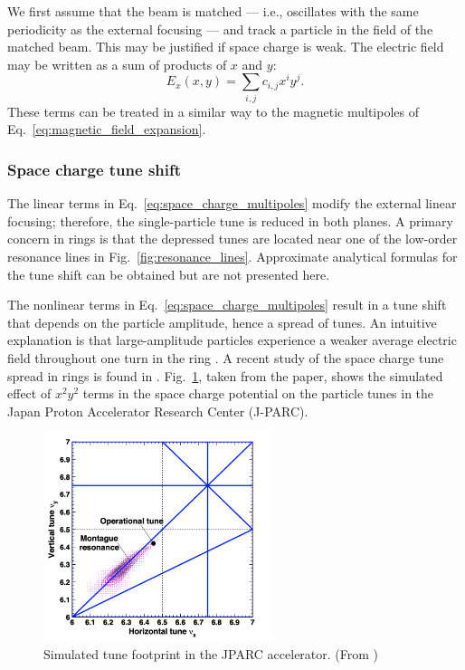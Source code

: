 We first assume that the beam is matched — i.e., oscillates with the same periodicity as the external focusing — and track a particle in the field of the matched beam. This may be justified if space charge is weak. The electric field may be written as a sum of products of $x$ and $y$:
%
\begin{equation}\label{eq:space_charge_multipoles}
    E_x(x, y) = \sum_{i, j}{c_{i, j} x^i y^j}.
\end{equation}
%
These terms can be treated in a similar way to the magnetic multipoles of Eq.~\eqref{eq:magnetic_field_expansion}.


\subsubsection{Space charge tune shift}

The linear terms in Eq.~\eqref{eq:space_charge_multipoles} modify the external linear focusing; therefore, the single-particle tune is reduced in both planes. A primary concern in rings is that the depressed tunes are located near one of the low-order resonance lines in Fig.~\ref{fig:resonance_lines}. Approximate analytical formulas for the tune shift can be obtained \cite{Ng2005} but are not presented here.

The nonlinear terms in Eq.~\eqref{eq:space_charge_multipoles} result in a tune shift that depends on the particle amplitude, hence a spread of tunes. An intuitive explanation is that large-amplitude particles experience a weaker average electric field throughout one turn in the ring \cite{Franchetti2017}. A recent study of the space charge tune spread in rings is found in \cite{Hotchi2020}. Fig.~\ref{fig:jparc_montague}, taken from the paper, shows the simulated effect of $x^2y^2$ terms in the space charge potential on the particle tunes in the Japan Proton Accelerator Research Center (J-PARC).
%
\begin{figure}[!p]
    \centering
    \includegraphics[width=0.6\textwidth]{Images/chapter1/montague.png}
    \caption{Simulated tune footprint in the JPARC accelerator. (From \cite{Hotchi2020})}
    \label{fig:jparc_montague}
\end{figure}
%

